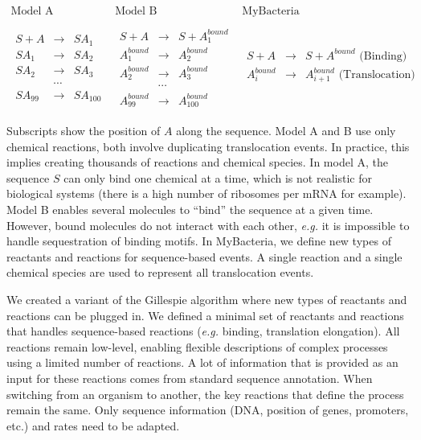 \[
\begin{array}{c|c|c}
  \text{Model A} & \text{Model B} & \text{MyBacteria}\\
  & & \\
  \begin{array}{rcl}
    S + A & \rightarrow & SA_1 \\
    SA_1 & \rightarrow & SA_2 \\
    SA_2 & \rightarrow & SA_3 \\
          & \cdots & \\
    SA_{99} & \rightarrow & SA_{100}
  \end{array}
  &
  \begin{array}{rcl}
    S + A & \rightarrow & S + A^{bound}_1 \\
    A^{bound}_1 & \rightarrow & A^{bound}_2 \\
    A^{bound}_2 & \rightarrow & A^{bound}_3 \\
          & \cdots & \\
    A^{bound}_{99} & \rightarrow & A^{bound}_{100}
  \end{array}
  &
  \begin{array}{rcl}
    S + A & \rightarrow & S + A^{bound} \text{ (Binding)} \\
    A^{bound}_i & \rightarrow & A^{bound}_{i+1} \text{ (Translocation)} \\
  \end{array}
\end{array}
\]

Subscripts show the position of $A$ along the sequence.
Model A and B use only chemical reactions, both involve duplicating
translocation events.
In practice, this implies creating thousands of reactions and chemical
species.
In model A, the sequence $S$ can only bind one chemical at a time,
which is not realistic for biological systems
(there is a high number of ribosomes per mRNA for example).
Model B enables several molecules to ``bind'' the sequence at a given time.
However, bound molecules do not interact with each other,
\textit{e.g.} it is impossible to handle sequestration of binding motifs.
In MyBacteria, we define new types of reactants and reactions
for sequence-based events.
A single reaction and a single chemical species are used to represent
all translocation events.

We created a variant of the Gillespie algorithm where new types of reactants
and reactions can be plugged in.
We defined a minimal set of reactants and reactions that handles
sequence-based reactions (\textit{e.g.} binding, translation elongation).
All reactions remain low-level, enabling flexible descriptions of
complex processes using a limited number of reactions.
A lot of information that is provided as an input for these reactions comes from
standard sequence annotation.
When switching from an organism to another, the key reactions that define the
process remain the same.
Only sequence information (DNA, position of genes, promoters, etc.) and rates
need to be adapted.

